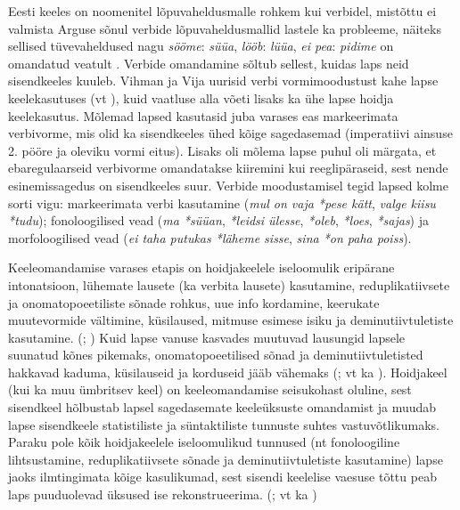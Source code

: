 \documentclass[12pt]{article}
\begin{document}
Eesti keeles on noomenitel lõpuvaheldusmalle rohkem kui verbidel, mistõttu ei valmista Arguse sõnul verbide lõpuvaheldusmallid lastele ka probleeme, näiteks sellised tüvevaheldused nagu \emph{sööme}: \emph{süüa}, \emph{lööb}: \emph{lüüa}, \emph{ei pea}: \emph{pidime} on omandatud veatult \citep[24]{ARGUSdiss}. Verbide omandamine sõltub sellest, kuidas laps neid sisendkeeles kuuleb. Vihman ja Vija uurisid verbi vormimoodustust kahe lapse keelekasutuses (vt \citealp{Vihman_Vija}), kuid vaatluse alla võeti lisaks ka ühe lapse hoidja keelekasutus. Mõlemad lapsed kasutasid juba varases eas markeerimata verbivorme, mis olid ka sisendkeeles ühed kõige sagedasemad (imperatiivi ainsuse 2. pööre ja oleviku vormi eitus). Lisaks oli mõlema lapse puhul oli märgata, et ebaregulaarseid verbivorme omandatakse kiiremini kui reeglipäraseid, sest nende esinemissagedus on sisendkeeles suur. Verbide moodustamisel tegid lapsed kolme sorti vigu: markeerimata verbi kasutamine (\emph{mul on vaja *pese kätt}, \emph{valge kiisu *tudu}); fonoloogilised vead (\emph{ma *süüan}, \emph{*leidsi ülesse}, \emph{*oleb}, \emph{*loes}, \emph{*sajas}) ja morfoloogilised vead (\emph{ei taha putukas *läheme sisse}, \emph{sina *on paha poiss}). \citep{Vihman_Vija}

Keeleomandamise varases etapis on hoidjakeelele iseloomulik eripärane intonatsioon, lühemate lausete (ka verbita lausete) kasutamine, reduplikatiivsete ja onomatopoeetiliste sõnade rohkus, uue info kordamine, keerukate muutevormide vältimine, küsilaused, mitmuse esimese isiku ja deminutiivtuletiste kasutamine. (\citealp[178--182]{Korgesaar}; \citealp[26--29]{Orusalu}) Kuid lapse vanuse kasvades muutuvad lausungid lapsele suunatud kõnes pikemaks, onomatopoeetilised sõnad ja deminutiivtuletisted hakkavad kaduma, küsilauseid ja korduseid jääb vähemaks (\citealp[37]{Korgesaar2}; vt ka \citealp{VihmanV}). Hoidjakeel (kui ka muu ümbritsev keel) on keeleomandamise seisukohast oluline, sest sisendkeel hõlbustab lapsel sagedasemate keeleüksuste omandamist ja muudab lapse sisendkeele statistiliste ja süntaktiliste tunnuste suhtes vastuvõtlikumaks. Paraku pole kõik hoidjakeelele iseloomulikud tunnused (nt fonoloogiline lihtsustamine, reduplikatiivsete sõnade ja deminutiivtuletiste kasutamine) lapse jaoks ilmtingimata kõige kasulikumad, sest sisendi keelelise vaesuse tõttu peab laps puuduolevad üksused ise rekonstrueerima. (\citealp{BeyondBabytalk}; vt ka \citealp{Newport})
\end{document}
